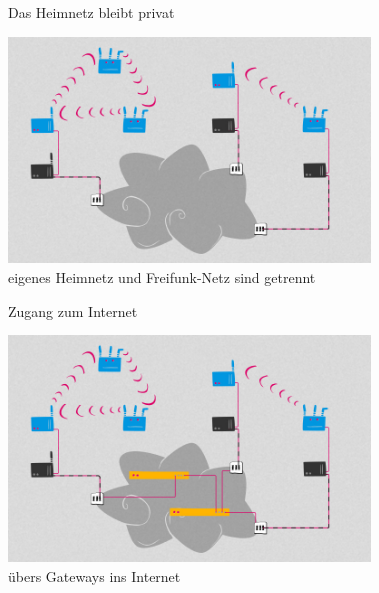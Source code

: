 \documentclass[10pt]{beamer}
\begin{document}
    \begin{frame}{Das Heimnetz bleibt privat}
      \begin{center}
        \includegraphics[height=6cm]{images/network_4}\\
        \vspace{1em}
        eigenes Heimnetz und Freifunk-Netz sind getrennt
        \vspace{1em}
      \end{center}
    \end{frame}

    \begin{frame}{Zugang zum Internet}
      \begin{center}
        \includegraphics[height=6cm]{images/network_5}\\
        \vspace{1em}
        übers Gateways ins Internet
        \vspace{1em}
      \end{center}
    \end{frame}
\end{document}
